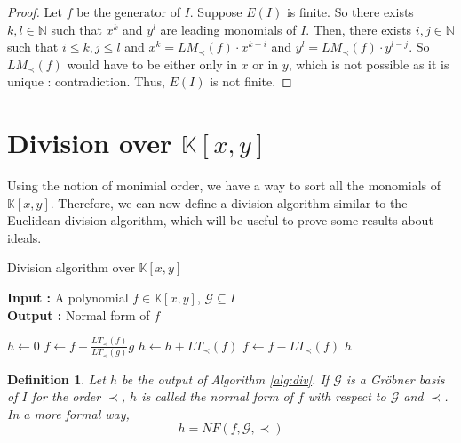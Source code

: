 \documentclass{article}
\newtheorem{definition}{Definition}[section]
\begin{document}
\begin{proof}
    Let $f$ be the generator of $I$. Suppose $E(I)$ is finite. So there exists $k, l \in \mathbb{N}$ such that $x^{k}$ and $y^{l}$ are leading monomials of $I$. Then, there exists $i, j \in \mathbb{N}$ such that $i \leq k, j \leq l$ and $x^{k} = LM_{\prec}(f) \cdot x^{k - i}$ and $y^{l} = LM_{\prec}(f) \cdot y^{l - j}$. So $LM_{\prec}(f)$ would have to be either only in $x$ or in $y$, which is not possible as it is unique : contradiction. Thus, $E(I)$ is not finite. 
\end{proof}

\section{Division over $\mathbb{K}[x, y]$}

\par Using the notion of monimial order, we have a way to sort all the monomials of $\mathbb{K}[x, y]$. Therefore, we can now define a division algorithm similar to the Euclidean division algorithm, which will be useful to prove some results about ideals. 

\begin{algorithm}[H]
\caption{Division algorithm over $\mathbb{K}[x, y]$} \label{alg:div}
\textbf{Input : }A polynomial $f \in \mathbb{K}[x, y]$, $\mathscr{G} \subseteq I$ \\
\textbf{Output : }Normal form of $f$
\begin{algorithmic}
    \State $h \gets 0$
            \State $f \gets f- \displaystyle \frac{LT_{\prec}(f)}{LT_{\prec}(g)}g$
        \Else
            \State $h \gets h + LT_{\prec}(f)$
            \State $f \gets f - LT_{\prec}(f)$
        \EndIf
    \EndWhile
    \State \Return $h$
\end{algorithmic}
\end{algorithm}


\begin{definition}
Let $h$ be the output of Algorithm \ref{alg:div}. If $\mathscr{G}$ is a Gröbner basis of $I$ for the order $\prec$, $h$ is called the normal form of $f$ with respect to $\mathscr{G}$ and $\prec$. In a more formal way, 
    \begin{displaymath}
        h = NF(f, \mathscr{G}, \prec)
    \end{displaymath}
\end{definition}
\end{document}
